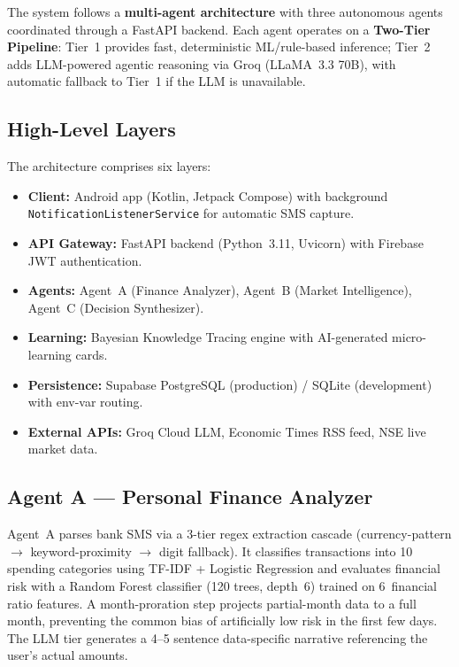 \documentclass[conference]{IEEEtran}
\begin{document}
The system follows a \textbf{multi-agent architecture} with three autonomous agents coordinated through a FastAPI backend. Each agent operates on a \textbf{Two-Tier Pipeline}: Tier~1 provides fast, deterministic ML/rule-based inference; Tier~2 adds LLM-powered agentic reasoning via Groq (LLaMA~3.3 70B), with automatic fallback to Tier~1 if the LLM is unavailable.

\subsection{High-Level Layers}

The architecture comprises six layers:
\begin{itemize}
  \item \textbf{Client:} Android app (Kotlin, Jetpack Compose) with background \texttt{NotificationListenerService} for automatic SMS capture.
  \item \textbf{API Gateway:} FastAPI backend (Python~3.11, Uvicorn) with Firebase JWT authentication.
  \item \textbf{Agents:} Agent~A (Finance Analyzer), Agent~B (Market Intelligence), Agent~C (Decision Synthesizer).
  \item \textbf{Learning:} Bayesian Knowledge Tracing engine with AI-generated micro-learning cards.
  \item \textbf{Persistence:} Supabase PostgreSQL (production) / SQLite (development) with env-var routing.
  \item \textbf{External APIs:} Groq Cloud LLM, Economic Times RSS feed, NSE live market data.
\end{itemize}

\subsection{Agent A --- Personal Finance Analyzer}

Agent~A parses bank SMS via a 3-tier regex extraction cascade (currency-pattern $\to$ keyword-proximity $\to$ digit fallback). It classifies transactions into 10 spending categories using TF-IDF + Logistic Regression and evaluates financial risk with a Random Forest classifier (120 trees, depth~6) trained on 6~financial ratio features. A month-proration step projects partial-month data to a full month, preventing the common bias of artificially low risk in the first few days. The LLM tier generates a 4--5 sentence data-specific narrative referencing the user's actual amounts.
\end{document}
